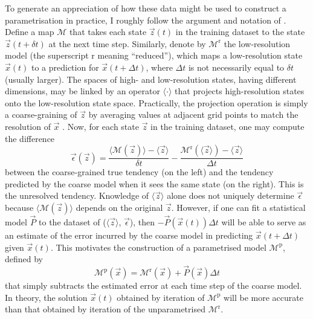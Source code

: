 \documentclass[../main.tex]{subfiles}
\begin{document}
To generate an appreciation of how these data might be used to construct a
parametrisation in practice, I roughly follow the argument and notation of
\textcite{brajard2021}. Define a map $\mathcal{M}$ that takes each state
$\vec{z}(t)$ in the training dataset to the state $\vec{z}(t + \delta t)$ at
the next time step. Similarly, denote by $\mathcal{M}^\mathrm{r}$ the
low-resolution model (the superscript r meaning ``reduced''), which maps a
low-resolution state $\vec{x}(t)$ to a prediction for $\vec{x}(t + \Delta t)$,
where $\Delta t$ is not necessarily equal to $\delta t$ (usually larger). The
spaces of high- and low-resolution states, having different dimensions, may be
linked by an operator $\langle \cdot \rangle$ that projects high-resolution
states onto the low-resolution state space. Practically, the projection
operation is simply a coarse-graining of $\vec{z}$ by averaging values at
adjacent grid points to match the resolution of $\vec{x}$ . Now, for each state $\vec{z}$ in the training dataset, one may
compute the difference
\begin{equation*}
    \vec{\epsilon}(\vec{z}) =
        \frac{
            \langle \mathcal{M}(\vec{z}) \rangle - \langle \vec{z} \rangle
        }{\delta t}
        - \frac{
            \mathcal{M}^\mathrm{r}(\langle \vec{z} \rangle)
            - \langle \vec{z} \rangle
        }{\Delta t}
\end{equation*}
between the coarse-grained true tendency (on the left) and the tendency
predicted by the coarse model when it sees the same state (on the right). This
is the unresolved tendency. Knowledge of $\langle \vec{z} \rangle$ alone does
not uniquely determine $\vec{\epsilon}$ because $\langle \mathcal{M}(\vec{z})
\rangle$ depends on the original $\vec{z}$. However, if one can fit a
statistical model $\vec{P}$ to the dataset of ($\langle \vec{z} \rangle$,
$\vec{\epsilon}$), then $-\vec{P}(\vec{x}(t)) \Delta t$ will be able to serve
as an estimate of the error incurred by the coarse model in predicting
$\vec{x}(t + \Delta t)$ given $\vec{x}(t)$. This motivates the construction of
a parametrised model $\mathcal{M}^\mathrm{p}$, defined by
\begin{equation*}
    \mathcal{M}^\mathrm{p}(\vec{x}) =
        \mathcal{M}^\mathrm{r}(\vec{x}) + \vec{P}(\vec{x}) \Delta t
\end{equation*}
that simply subtracts the estimated error at each time step of the coarse
model. In theory, the solution $\vec{x}(t)$ obtained by iteration of
$\mathcal{M}^\mathrm{p}$ will be more accurate than that obtained by
iteration of the unparametrised $\mathcal{M}^\mathrm{r}$.
\end{document}
